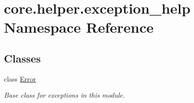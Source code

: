 \hypertarget{namespacecore_1_1helper_1_1exception__help}{\section{core.\-helper.\-exception\-\_\-help Namespace Reference}
\label{namespacecore_1_1helper_1_1exception__help}
}
\subsection*{Classes}
\begin{DoxyCompactItemize}
\item 
class \hyperlink{classcore_1_1helper_1_1exception__help_1_1Error}{Error}
\begin{DoxyCompactList}\small\item\em Base class for exceptions in this module. \end{DoxyCompactList}\end{DoxyCompactItemize}
